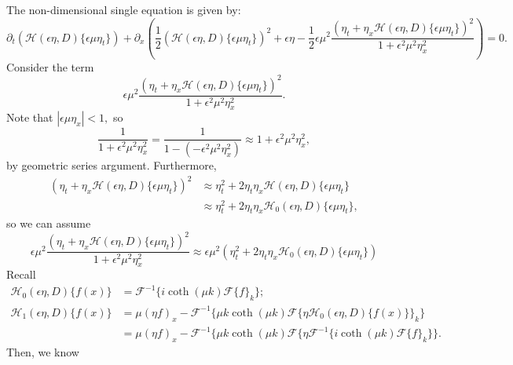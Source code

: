 \documentclass[10pt,reqno,oneside,a4paper]{article}
\begin{document}
The non-dimensional single equation is given by:
\begin{equation}\label{NondimH}
\partial_t\left(\mathcal{H}(\epsilon\eta, D)\{ \epsilon \mu \eta_t\} \right) + \partial_x\left( \frac{1}{2}\left(\mathcal{H}(\epsilon\eta, D)\{ \epsilon \mu \eta_t\} \right)^2 + \epsilon \eta - \frac{1}{2}\epsilon \mu^2 \frac{(\eta_t + \eta_x \mathcal{H}(\epsilon\eta, D)\{ \epsilon \mu \eta_t\})^2}{1+\epsilon^2 \mu^2 \eta_x^2}\right) = 0.
\end{equation}
Consider the term 
\[ \epsilon \mu^2 \frac{(\eta_t + \eta_x \mathcal{H}(\epsilon\eta, D)\{ \epsilon \mu \eta_t\})^2}{1+\epsilon^2 \mu^2 \eta_x^2} .\]
Note that $|\epsilon \mu \eta_x|<1,$ so 
\[ 
\frac{1}{1+\epsilon^2 \mu^2 \eta_x^2} = \frac{1}{1-(-\epsilon^2 \mu^2 \eta_x^2)} \approx 1 + \epsilon^2 \mu^2 \eta_x^2,
\]
by geometric series argument.
Furthermore, 
\begin{align*}
(\eta_t + \eta_x \mathcal{H}(\epsilon\eta, D)\{ \epsilon \mu \eta_t\})^2 &\approx \eta_t^2 + 2 \eta_t \eta_x \mathcal{H}(\epsilon\eta, D)\{ \epsilon \mu \eta_t\} \\
&\approx \eta_t^2 + 2 \eta_t \eta_x \mathcal{H}_0(\epsilon\eta, D)\{ \epsilon \mu \eta_t\},
\end{align*}
so we can assume 
\[ 
\epsilon \mu^2 \frac{(\eta_t + \eta_x \mathcal{H}(\epsilon\eta, D)\{ \epsilon \mu \eta_t\})^2}{1+\epsilon^2 \mu^2 \eta_x^2} \approx \epsilon \mu^2 (\eta_t^2 + 2 \eta_t \eta_x \mathcal{H}_0(\epsilon\eta, D)\{ \epsilon \mu \eta_t\})
\]
Recall 
\begin{align*}
\mathcal{H}_0(\epsilon\eta, D)\{ f(x)\} &= \mathcal{F}^{-1} \{ i \coth (\mu k) \mathcal{F}\{f\}_k\}; \\
\mathcal{H}_1(\epsilon\eta, D)\{ f(x)\} &= \mu (\eta f)_x - \mathcal{F}^{-1} \{ \mu k \coth (\mu k) \mathcal{F}\{\eta \mathcal{H}_0(\epsilon\eta, D)\{ f(x)\}\}_k\} \\
&= \mu (\eta f)_x - \mathcal{F}^{-1} \{ \mu k \coth (\mu k) \mathcal{F}\{\eta \mathcal{F}^{-1} \{ i \coth (\mu k) \mathcal{F}\{f\}_k\} \}.
\end{align*}
Then, we know 
\end{document}
